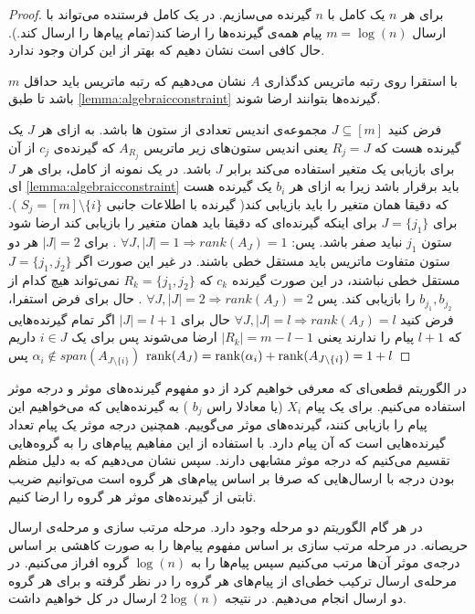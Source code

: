 \begin{proof}
	برای هر
	$n$
	یک 
	\picod
	کامل با
	$n$
	گیرنده می‌سازیم. در یک 
	\picod
	کامل فرستنده می‌تواند با ارسال
	$m = \log(n)$
	پیام همه‌ی گیرنده‌ها را ارضا کند(تمام پیام‌ها را ارسال کند.). حال کافی است نشان دهیم که بهتر از این کران وجود ندارد.
	
	با استقرا روی رتبه ماتریس کدگذاری 
	$A$
	نشان می‌دهیم که رتبه ماتریس باید حداقل 
	$m$
	باشد تا طبق
	\autoref{lemma:algebraicconstraint}
	گیرنده‌ها بتوانند ارضا شوند.
	
	فرض کنید
	$J \subseteq [m]$
	مجموعه‌ی اندیس تعدادی از ستون ها باشد. به ازای هر
	$J$
	یک گیرنده هست که 
	$R_j = J$
	یعنی اندیس ستون‌های زیر ماتریس
	$A_{R_j}$
	که گیرنده‌ی
	$c_j$
	از آن برای بازیابی یک متغیر استفاده می‌کند برابر
	$J$
	باشد. در یک نمونه از
		\picod
		کامل، برای هر
		$J$
		ای 
			\autoref{lemma:algebraicconstraint}
			باید برقرار باشد زیرا به ازای هر
			$b_i$
			یک گیرنده هست که دقیقا همان متغیر را باید بازیابی کند(
			گیرنده با اطلاعات جانبی
			$S_j = [m] \setminus \{i\}$
			). برای
			$J = \{j_1\}$
			برای اینکه گیرنده‌ای که دقیقا باید همان متغیر را بازیابی کند ارضا شود ستون
			$j_1$
			نباید صفر باشد. پس: 
			$\forall J, |J| = 1 \Rightarrow rank(A_J) = 1$
			. برای
			$|J| = 2$
			هر دو ستون متفاوت ماتریس باید مستقل خطی باشند. در غیر این صورت اگر
			$J = \{j_1, j_2\}$
			مستقل خطی نباشند، در این صورت گیرنده‌
			$c_k$
			که
			$R_k = \{j_1, j_2\}$
			نمی‌تواند هیچ کدام از 
			$b_{j_1}, b_{j_2}$
			را بازیابی کند. پس 
		$\forall J, |J| = 2 \Rightarrow rank(A_J) = 2$
		. حال برای فرض استفرا، فرض کنید
		$\forall J, |J| = l \Rightarrow rank(A_J) = l$
		حال برای
		$|J| = l + 1$
		اگر تمام گیرنده‌هایی که
		$l + 1$
		پیام را ندارند یعنی
		$|R_k| = m - l - 1 $
		ارضا می‌شوند پس برای یک
		$i \in J$
		داریم
		$\alpha_i \notin span(A_{J \setminus \{i\}})$
		پس
		$\operatorname{rank}(A_{J}) = \operatorname{rank}(\alpha_i) + \operatorname{rank}(A_{J \setminus \{i\}}) = 1 + l$
\end{proof}
در الگوریتم قطعی‌ای که معرفی خواهیم کرد از دو مفهوم گیرنده‌های موثر و درجه موثر استفاده می‌کنیم. برای یک پیام
$X_i$
(یا معادلا راس
$b_j$
)
به گیرنده‌هایی که می‌خواهیم این پیام را بازیابی کنند، گیرنده‌های موثر می‌گوییم. همچنین درجه موثر یک پیام تعداد گیرنده‌هایی است که آن پیام دارد. با استفاده از این مفاهیم پیام‌های را به گروه‌هایی تقسیم می‌کنیم که درجه موثر مشابهی دارند. سپس نشان می‌دهیم که به دلیل منظم بودن درجه با ارسال‌هایی که صرفا بر اساس پیام‌های هر گروه است می‌توانیم ضریب ثابتی از گیرنده‌های موثر هر گروه را ارضا کنیم.

در هر گام الگوریتم
دو مرحله وجود دارد. مرحله مرتب سازی و مرحله‌ی ارسال حریصانه. در مرحله مرتب سازی بر اساس مفهوم پیام‌ها را به صورت کاهشی بر اساس درجه‌ی موثر آن‌ها مرتب می‌کنیم سپس پیام‌ها را به 
$\log(n)$
گروه افراز می‌کنیم. در مرحله‌ی ارسال ترکیب خطی‌ای از پیام‌های هر گروه را در نظر گرفته و برای هر گروه دو ارسال انجام می‌دهیم. در نتیجه
$2 \log(n)$
ارسال در کل خواهیم داشت.

